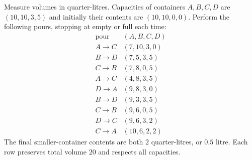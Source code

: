 Measure volumes in quarter-litres. Capacities of containers $ A,B,C,D $ are $(10,10,3,5)$ and initially their contents are $(10,10,0,0)$. Perform the following pours, stopping at empty or full each time:
\[\begin{array}{c|c} \text{pour}&(A,B,C,D)\\ A\to C&(7,10,3,0)\\ B\to D&(7,5,3,5)\\ C\to B&(7,8,0,5)\\ A\to C&(4,8,3,5)\\ D\to A&(9,8,3,0)\\ B\to D&(9,3,3,5)\\ C\to B&(9,6,0,5)\\ D\to C&(9,6,3,2)\\ C\to A&(10,6,2,2)\end{array}\]
The final smaller-container contents are both $ 2 $ quarter-litres, or $\boxed{0.5\text{ litre}}$. Each row preserves total volume $ 20 $ and respects all capacities.
